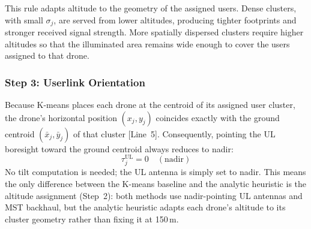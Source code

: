 \documentclass[conference]{IEEEtran}
\newcommand{\dB}{\,\mathrm{dB}}
\begin{document}
This rule adapts altitude to the geometry of the assigned users. Dense clusters, with small $\sigma_j$, are served from lower altitudes, producing tighter footprints and stronger received signal strength. More spatially dispersed clusters require higher altitudes so that the illuminated area remains wide enough to cover the users assigned to that drone.

\subsubsection{Step 3: Userlink Orientation}
Because K-means places each drone at the centroid of its assigned user cluster, the drone's horizontal position $(x_j, y_j)$ coincides exactly with the ground centroid $(\bar{x}_j, \bar{y}_j)$ of that cluster [Line~5].
Consequently, pointing the UL boresight toward the ground centroid always reduces to nadir:
\begin{equation}
\tau_j^{\mathrm{UL}} = 0 \quad (\text{nadir})
\end{equation}
No tilt computation is needed; the UL antenna is simply set to nadir.
This means the only difference between the K-means baseline and the analytic heuristic is the altitude assignment (Step~2): both methods use nadir-pointing UL antennas and MST backhaul, but the analytic heuristic adapts each drone's altitude to its cluster geometry rather than fixing it at 150\,m.
\end{document}
